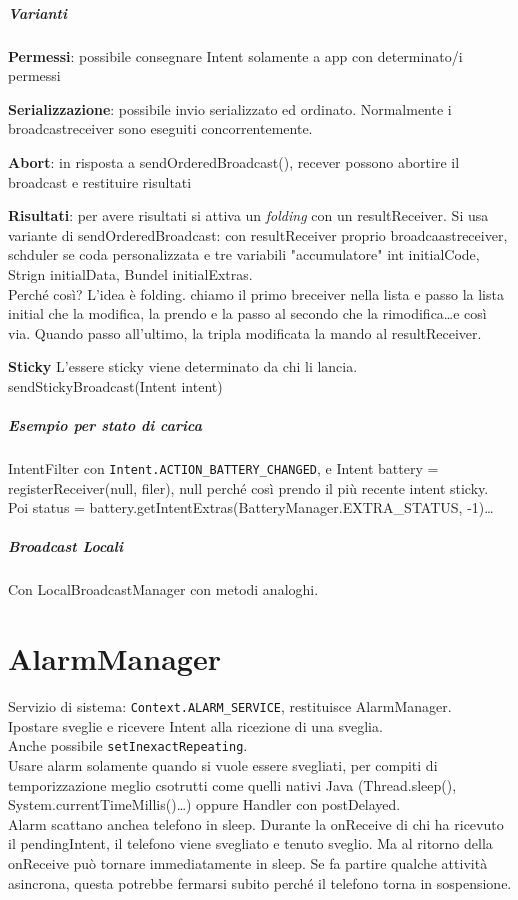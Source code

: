 \documentclass[10pt]{book}
\begin{document}
\paragraph{Varianti}
\begin{list}{}{}
	\item \textbf{Permessi}: possibile consegnare Intent solamente a app con determinato/i permessi
	\item \textbf{Serializzazione}: possibile invio serializzato ed ordinato. Normalmente i broadcastreceiver sono eseguiti concorrentemente.
	\item \textbf{Abort}: in risposta a sendOrderedBroadcast(), recever possono abortire il broadcast e restituire risultati
	\item \textbf{Risultati}: per avere risultati si attiva un \textit{folding} con un resultReceiver. Si usa variante di sendOrderedBroadcast: con resultReceiver proprio broadcaastreceiver, schduler se coda personalizzata e tre variabili "accumulatore" int initialCode, Strign initialData, Bundel initialExtras.\\
	Perché così? L'idea è folding. chiamo il primo breceiver nella lista e passo la lista initial che la modifica, la prendo e la passo al secondo che la rimodifica\ldots e così via. Quando passo all'ultimo, la tripla modificata la mando al resultReceiver.
	\item \textbf{Sticky} L'essere sticky viene determinato da chi li lancia. sendStickyBroadcast(Intent intent)
\end{list}
\paragraph{Esempio per stato di carica} IntentFilter con \texttt{Intent.ACTION\_BATTERY\_CHANGED}, e Intent battery = registerReceiver(null, filer), null perché così prendo il più recente intent sticky.\\
Poi status = battery.getIntentExtras(BatteryManager.EXTRA\_STATUS, -1)\ldots
\paragraph{Broadcast Locali} Con LocalBroadcastManager con metodi analoghi.
\chapter{AlarmManager}
Servizio di sistema: \texttt{Context.ALARM\_SERVICE}, restituisce AlarmManager.\\
Ipostare sveglie e ricevere Intent alla ricezione di una sveglia.\\
Anche possibile \texttt{setInexactRepeating}.\\
Usare alarm solamente quando si vuole essere svegliati, per compiti di temporizzazione meglio csotrutti come quelli nativi Java (Thread.sleep(), System.currentTimeMillis()\ldots) oppure Handler con postDelayed.\\
Alarm scattano anchea telefono in sleep. Durante la onReceive di chi ha ricevuto il pendingIntent, il telefono viene svegliato e tenuto sveglio. Ma al ritorno della onReceive può tornare immediatamente in sleep. Se fa partire qualche attività asincrona, questa potrebbe fermarsi subito perché il telefono torna in sospensione.
\end{document}
